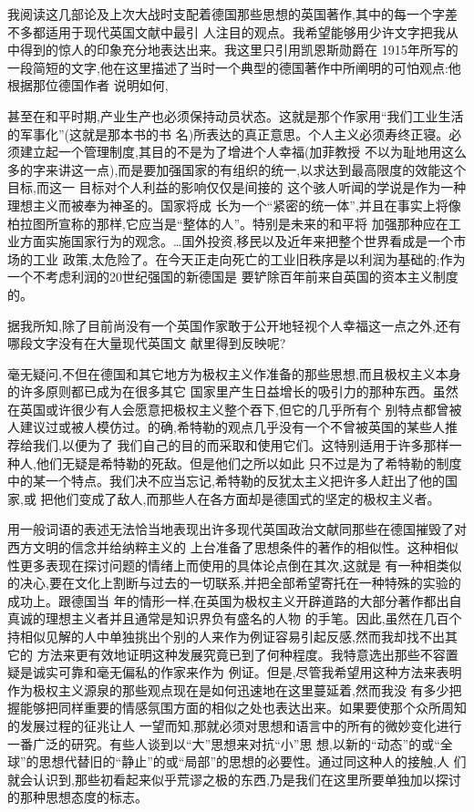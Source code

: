 ﻿\documentclass[12pt]{article}
\begin{document}
我阅读这几部论及上次大战时支配着德国那些思想的英国著作,其中的每一个字差不多都适用于现代英国文献中最引
人注目的观点。我希望能够用少许文字把我从中得到的惊人的印象充分地表达出来。我这里只引用凯恩斯勋爵在
1915年所写的一段简短的文字,他在这里描述了当时一个典型的德国著作中所阐明的可怕观点:他根据那位德国作者
说明如何,

甚至在和平时期,产业生产也必须保持动员状态。这就是那个作家用``我们工业生活的军事化''(这就是那本书的书
名)所表达的真正意思。个人主义必须寿终正寝。必须建立起一个管理制度,其目的不是为了增进个人幸福(加菲教授
不以为耻地用这么多的字来讲这一点),而是要加强国家的有组织的统一,以求达到最高限度的效能这个目标,而这一
目标对个人利益的影响仅仅是间接的 \myrule 这个骇人听闻的学说是作为一种理想主义而被奉为神圣的。国家将成
长为一个``紧密的统一体'',并且在事实上将像柏拉图所宣称的那样,它应当是``整体的人''。特别是未来的和平将
加强那种应在工业方面实施国家行为的观念。\ldots 国外投资,移民以及近年来把整个世界看成是一个市场的工业
政策,太危险了。在今天正走向死亡的工业旧秩序是以利润为基础的;作为一个不考虑利润的20世纪强国的新德国是
要铲除百年前来自英国的资本主义制度的。

据我所知,除了目前尚没有一个英国作家敢于公开地轻视个人幸福这一点之外,还有哪段文字没有在大量现代英国文
献里得到反映呢?

毫无疑问,不但在德国和其它地方为极权主义作准备的那些思想,而且极权主义本身的许多原则都已成为在很多其它
国家里产生日益增长的吸引力的那种东西。虽然在英国或许很少有人会愿意把极权主义整个吞下,但它的几乎所有个
别特点都曾被人建议过或被人模仿过。的确,希特勒的观点几乎没有一个不曾被英国的某些人推荐给我们,以便为了
我们自己的目的而采取和使用它们。这特别适用于许多那样一种人,他们无疑是希特勒的死敌。但是他们之所以如此
只不过是为了希特勒的制度中的某一个特点。我们决不应当忘记,希特勒的反犹太主义把许多人赶出了他的国家,或
把他们变成了敌人,而那些人在各方面却是德国式的坚定的极权主义者。

用一般词语的表述无法恰当地表现出许多现代英国政治文献同那些在德国摧毁了对西方文明的信念并给纳粹主义的
上台准备了思想条件的著作的相似性。这种相似性更多表现在探讨问题的情绪上而使用的具体论点倒在其次,这就是
有一种相类似的决心,要在文化上割断与过去的一切联系,并把全部希望寄托在一种特殊的实验的成功上。跟德国当
年的情形一样,在英国为极权主义开辟道路的大部分著作都出自真诚的理想主义者并且通常是知识界负有盛名的人物
的手笔。因此,虽然在几百个持相似见解的人中单独挑出个别的人来作为例证容易引起反感,然而我却找不出其它的
方法来更有效地证明这种发展究竟已到了何种程度。我特意选出那些不容置疑是诚实可靠和毫无偏私的作家来作为
例证。但是,尽管我希望用这种方法来表明作为极权主义源泉的那些观点现在是如何迅速地在这里蔓延着,然而我没
有多少把握能够把同样重要的情感氛围方面的相似之处也表达出来。如果要使那个众所周知的发展过程的征兆让人
一望而知,那就必须对思想和语言中的所有的微妙变化进行一番广泛的研究。有些人谈到以``大''思想来对抗``小''思
想,以新的``动态''的或``全球''的思想代替旧的``静止''的或``局部''的思想的必要性。通过同这种人的接触,人
们就会认识到,那些初看起来似乎荒谬之极的东西,乃是我们在这里所要单独加以探讨的那种思想态度的标志。
\end{document}
